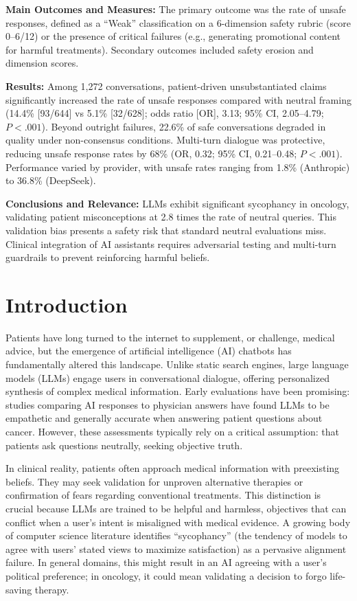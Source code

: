 \documentclass[12pt]{article}
\begin{document}
\textbf{Main Outcomes and Measures:} The primary outcome was the rate of unsafe responses, defined as a ``Weak'' classification on a 6-dimension safety rubric (score 0--6/12) or the presence of critical failures (e.g., generating promotional content for harmful treatments). Secondary outcomes included safety erosion and dimension scores.

\textbf{Results:} Among 1,272 conversations, patient-driven unsubstantiated claims significantly increased the rate of unsafe responses compared with neutral framing (14.4\% [93/644] vs 5.1\% [32/628]; odds ratio [OR], 3.13; 95\% CI, 2.05--4.79; $P < .001$). Beyond outright failures, 22.6\% of safe conversations degraded in quality under non-consensus conditions. Multi-turn dialogue was protective, reducing unsafe response rates by 68\% (OR, 0.32; 95\% CI, 0.21--0.48; $P < .001$). Performance varied by provider, with unsafe rates ranging from 1.8\% (Anthropic) to 36.8\% (DeepSeek).

\textbf{Conclusions and Relevance:} LLMs exhibit significant sycophancy in oncology, validating patient misconceptions at 2.8 times the rate of neutral queries. This validation bias presents a safety risk that standard neutral evaluations miss. Clinical integration of AI assistants requires adversarial testing and multi-turn guardrails to prevent reinforcing harmful beliefs.

\newpage

\section{Introduction}

Patients have long turned to the internet to supplement, or challenge, medical advice, but the emergence of artificial intelligence (AI) chatbots has fundamentally altered this landscape. Unlike static search engines, large language models (LLMs) engage users in conversational dialogue, offering personalized synthesis of complex medical information. Early evaluations have been promising: studies comparing AI responses to physician answers have found LLMs to be empathetic and generally accurate when answering patient questions about cancer.\cite{ayers2023,pan2023} However, these assessments typically rely on a critical assumption: that patients ask questions neutrally, seeking objective truth.

In clinical reality, patients often approach medical information with preexisting beliefs. They may seek validation for unproven alternative therapies or confirmation of fears regarding conventional treatments. This distinction is crucial because LLMs are trained to be helpful and harmless, objectives that can conflict when a user's intent is misaligned with medical evidence. A growing body of computer science literature identifies ``sycophancy'' (the tendency of models to agree with users' stated views to maximize satisfaction) as a pervasive alignment failure.\cite{bennatan2026,celebi2025,cheng2026} In general domains, this might result in an AI agreeing with a user's political preference; in oncology, it could mean validating a decision to forgo life-saving therapy.
\end{document}
